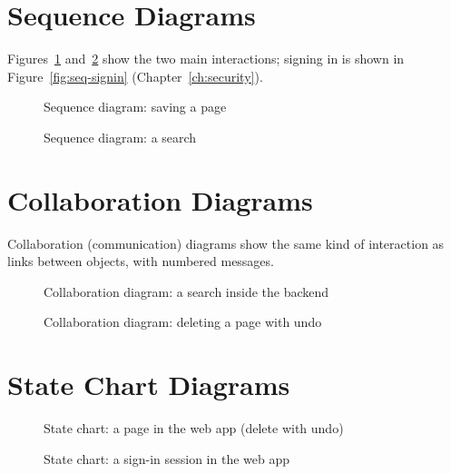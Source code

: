 \section{Sequence Diagrams}

Figures~\ref{fig:seq-save} and~\ref{fig:seq-search} show the two main
interactions; signing in is shown in Figure~\ref{fig:seq-signin}
(Chapter~\ref{ch:security}).

\begin{figure}[H]
\centering

\caption{Sequence diagram: saving a page}
\label{fig:seq-save}
\end{figure}

\begin{figure}[H]
\centering

\caption{Sequence diagram: a search}
\label{fig:seq-search}
\end{figure}

\section{Collaboration Diagrams}

Collaboration (communication) diagrams show the same kind of interaction as
links between objects, with numbered messages.

\begin{figure}[H]
\centering

\caption{Collaboration diagram: a search inside the backend}
\label{fig:collab-search}
\end{figure}

\begin{figure}[H]
\centering

\caption{Collaboration diagram: deleting a page with undo}
\label{fig:collab-delete}
\end{figure}

\section{State Chart Diagrams}

\begin{figure}[H]
\centering

\caption{State chart: a page in the web app (delete with undo)}
\label{fig:state-page}
\end{figure}

\begin{figure}[H]
\centering

\caption{State chart: a sign-in session in the web app}
\label{fig:state-session}
\end{figure}

